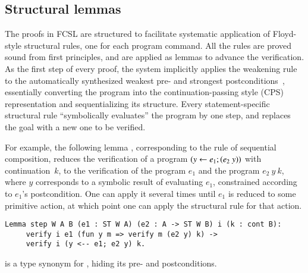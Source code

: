 %
%
%
%

\subsection{Structural lemmas}
\label{sec:lemmas}

The proofs in FCSL are structured to facilitate systematic application
of Floyd-style structural rules, one for each program command. All the
rules are proved sound from first principles, and are applied as
lemmas to advance the verification.
%
As the first step of every proof, the system implicitly applies the
weakening rule to the automatically synthesized weakest pre- and
strongest postconditions~\cite{Dijkstra:CACM75}, essentially
converting the program into the continuation-passing style (CPS)
representation and sequentializing its structure.
%
Every statement-specific structural rule ``symbolically evaluates''
the program by one step, and replaces the goal with a new one to be
verified.

For example, the following lemma , corresponding to the
rule of sequential composition, reduces the verification of a program
$(y \leftarrow e_1; (e_2~y))$ with continuation~$k$, to the verification
of the program $e_1$ and the program $e_2~y~k$, where $y$ corresponds
to a symbolic result of evaluating $e_1$, constrained according to
$e_1$'s postcondition. One can apply it several times until $e_1$ is
reduced to some primitive action, at which point one can apply the
structural rule for that action.
%
\begin{lstlisting}
Lemma step W A B (e1 : ST W A) (e2 : A -> ST W B) i (k : cont B): 
     verify i e1 (fun y m => verify m (e2 y) k) -> 
     verify i (y <-- e1; e2 y) k.  
\end{lstlisting}
%
 is a type synonym for , hiding its pre- and
postconditions.




